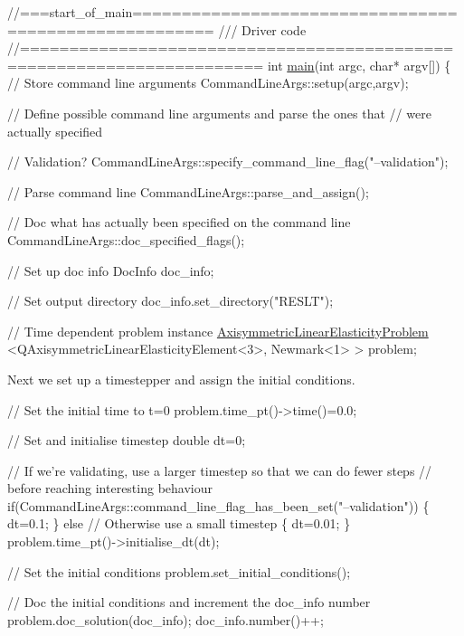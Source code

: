  
\begin{DoxyCodeInclude}
\textcolor{comment}{//===start\_of\_main======================================================}
\textcolor{comment}{/// Driver code }
\textcolor{comment}{}\textcolor{comment}{//======================================================================}
\textcolor{keywordtype}{int} \hyperlink{cylinder_8cc_a0ddf1224851353fc92bfbff6f499fa97}{main}(\textcolor{keywordtype}{int} argc, \textcolor{keywordtype}{char}* argv[])
\{
 \textcolor{comment}{// Store command line arguments}
 CommandLineArgs::setup(argc,argv);

 \textcolor{comment}{// Define possible command line arguments and parse the ones that}
 \textcolor{comment}{// were actually specified}

 \textcolor{comment}{// Validation?}
 CommandLineArgs::specify\_command\_line\_flag(\textcolor{stringliteral}{"--validation"});

 \textcolor{comment}{// Parse command line}
 CommandLineArgs::parse\_and\_assign(); 

 \textcolor{comment}{// Doc what has actually been specified on the command line}
 CommandLineArgs::doc\_specified\_flags();

 \textcolor{comment}{// Set up doc info}
 DocInfo doc\_info;

 \textcolor{comment}{// Set output directory}
 doc\_info.set\_directory(\textcolor{stringliteral}{"RESLT"});

 \textcolor{comment}{// Time dependent problem instance}
 \hyperlink{classAxisymmetricLinearElasticityProblem}{AxisymmetricLinearElasticityProblem}
  <QAxisymmetricLinearElasticityElement<3>, Newmark<1> > problem;

\end{DoxyCodeInclude}


Next we set up a timestepper and assign the initial conditions.


\begin{DoxyCodeInclude}
 \textcolor{comment}{// Set the initial time to t=0}
 problem.time\_pt()->time()=0.0;

 \textcolor{comment}{// Set and initialise timestep}
 \textcolor{keywordtype}{double} dt=0;

 \textcolor{comment}{// If we're validating, use a larger timestep so that we can do fewer steps}
 \textcolor{comment}{// before reaching interesting behaviour}
 \textcolor{keywordflow}{if}(CommandLineArgs::command\_line\_flag\_has\_been\_set(\textcolor{stringliteral}{"--validation"}))
  \{
   dt=0.1;
  \}
 \textcolor{keywordflow}{else} \textcolor{comment}{// Otherwise use a small timestep}
  \{
   dt=0.01;
  \}
 problem.time\_pt()->initialise\_dt(dt);

 \textcolor{comment}{// Set the initial conditions}
 problem.set\_initial\_conditions();

 \textcolor{comment}{// Doc the initial conditions and increment the doc\_info number}
 problem.doc\_solution(doc\_info);
 doc\_info.number()++;

\end{DoxyCodeInclude}


